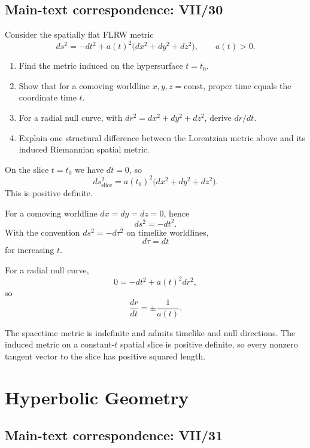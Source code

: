 \subsection*{Main-text correspondence: VII/30}

\begin{problem}
\label{prob:cp-vii-0082}
Consider the spatially flat FLRW metric
\[
ds^2=-dt^2+a(t)^2\bigl(dx^2+dy^2+dz^2\bigr),
\qquad a(t)>0.
\]

\begin{enumerate}
\item Find the metric induced on the hypersurface \(t=t_0\).
\item Show that for a comoving worldline \(x,y,z=\mathrm{const}\), proper
      time equals the coordinate time \(t\).
\item For a radial null curve, with
      \(dr^2=dx^2+dy^2+dz^2\), derive \(dr/dt\).
\item Explain one structural difference between the Lorentzian metric
      above and its induced Riemannian spatial metric.
\end{enumerate}
\end{problem}

\begin{solution}
On the slice \(t=t_0\) we have \(dt=0\), so
\[
ds_{\mathrm{slice}}^2
=
a(t_0)^2\bigl(dx^2+dy^2+dz^2\bigr).
\]
This is positive definite.

For a comoving worldline \(dx=dy=dz=0\), hence
\[
ds^2=-dt^2.
\]
With the convention \(ds^2=-d\tau^2\) on timelike worldlines,
\[
d\tau=dt
\]
for increasing \(t\).

For a radial null curve,
\[
0=-dt^2+a(t)^2dr^2,
\]
so
\[
\boxed{\frac{dr}{dt}=\pm\frac1{a(t)}}.
\]

The spacetime metric is indefinite and admits timelike and null
directions.  The induced metric on a constant-\(t\) spatial slice is
positive definite, so every nonzero tangent vector to the slice has
positive squared length.
\end{solution}

\section{Hyperbolic Geometry}

\subsection*{Main-text correspondence: VII/31}

